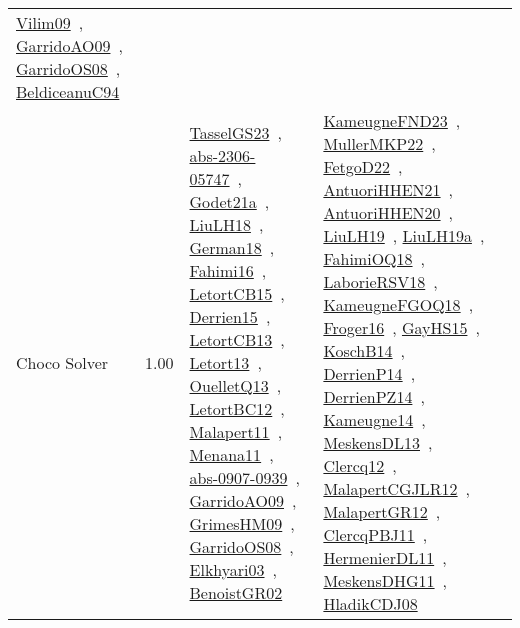 {\begin{longtable}{p{3cm}r>{\raggedright\arraybackslash}p{6cm}>{\raggedright\arraybackslash}p{6cm}>{\raggedright\arraybackslash}p{8cm}}
\href{../works/Vilim09.pdf}{Vilim09}~\cite{Vilim09}, \href{../works/GarridoAO09.pdf}{GarridoAO09}~\cite{GarridoAO09}, \href{../works/GarridoOS08.pdf}{GarridoOS08}~\cite{GarridoOS08}, \href{../works/BeldiceanuC94.pdf}{BeldiceanuC94}~\cite{BeldiceanuC94}\\
\index{Choco Solver}\index{CPSystems!Choco Solver}Choco Solver &  1.00 & \href{../works/TasselGS23.pdf}{TasselGS23}~\cite{TasselGS23}, \href{../works/abs-2306-05747.pdf}{abs-2306-05747}~\cite{abs-2306-05747}, \href{../works/Godet21a.pdf}{Godet21a}~\cite{Godet21a}, \href{../works/LiuLH18.pdf}{LiuLH18}~\cite{LiuLH18}, \href{../works/German18.pdf}{German18}~\cite{German18}, \href{../works/Fahimi16.pdf}{Fahimi16}~\cite{Fahimi16}, \href{../works/LetortCB15.pdf}{LetortCB15}~\cite{LetortCB15}, \href{../works/Derrien15.pdf}{Derrien15}~\cite{Derrien15}, \href{../works/LetortCB13.pdf}{LetortCB13}~\cite{LetortCB13}, \href{../works/Letort13.pdf}{Letort13}~\cite{Letort13}, \href{../works/OuelletQ13.pdf}{OuelletQ13}~\cite{OuelletQ13}, \href{../works/LetortBC12.pdf}{LetortBC12}~\cite{LetortBC12}, \href{../works/Malapert11.pdf}{Malapert11}~\cite{Malapert11}, \href{../works/Menana11.pdf}{Menana11}~\cite{Menana11}, \href{../works/abs-0907-0939.pdf}{abs-0907-0939}~\cite{abs-0907-0939}, \href{../works/GarridoAO09.pdf}{GarridoAO09}~\cite{GarridoAO09}, \href{../works/GrimesHM09.pdf}{GrimesHM09}~\cite{GrimesHM09}, \href{../works/GarridoOS08.pdf}{GarridoOS08}~\cite{GarridoOS08}, \href{../works/Elkhyari03.pdf}{Elkhyari03}~\cite{Elkhyari03}, \href{../works/BenoistGR02.pdf}{BenoistGR02}~\cite{BenoistGR02} & \href{../works/KameugneFND23.pdf}{KameugneFND23}~\cite{KameugneFND23}, \href{../works/MullerMKP22.pdf}{MullerMKP22}~\cite{MullerMKP22}, \href{../works/FetgoD22.pdf}{FetgoD22}~\cite{FetgoD22}, \href{../works/AntuoriHHEN21.pdf}{AntuoriHHEN21}~\cite{AntuoriHHEN21}, \href{../works/AntuoriHHEN20.pdf}{AntuoriHHEN20}~\cite{AntuoriHHEN20}, \href{../works/LiuLH19.pdf}{LiuLH19}~\cite{LiuLH19}, \href{../works/LiuLH19a.pdf}{LiuLH19a}~\cite{LiuLH19a}, \href{../works/FahimiOQ18.pdf}{FahimiOQ18}~\cite{FahimiOQ18}, \href{../works/LaborieRSV18.pdf}{LaborieRSV18}~\cite{LaborieRSV18}, \href{../works/KameugneFGOQ18.pdf}{KameugneFGOQ18}~\cite{KameugneFGOQ18}, \href{../works/Froger16.pdf}{Froger16}~\cite{Froger16}, \href{../works/GayHS15.pdf}{GayHS15}~\cite{GayHS15}, \href{../works/KoschB14.pdf}{KoschB14}~\cite{KoschB14}, \href{../works/DerrienP14.pdf}{DerrienP14}~\cite{DerrienP14}, \href{../works/DerrienPZ14.pdf}{DerrienPZ14}~\cite{DerrienPZ14}, \href{../works/Kameugne14.pdf}{Kameugne14}~\cite{Kameugne14}, \href{../works/MeskensDL13.pdf}{MeskensDL13}~\cite{MeskensDL13}, \href{../works/Clercq12.pdf}{Clercq12}~\cite{Clercq12}, \href{../works/MalapertCGJLR12.pdf}{MalapertCGJLR12}~\cite{MalapertCGJLR12}, \href{../works/MalapertGR12.pdf}{MalapertGR12}~\cite{MalapertGR12}, \href{../works/ClercqPBJ11.pdf}{ClercqPBJ11}~\cite{ClercqPBJ11}, \href{../works/HermenierDL11.pdf}{HermenierDL11}~\cite{HermenierDL11}, \href{../works/MeskensDHG11.pdf}{MeskensDHG11}~\cite{MeskensDHG11}, \href{../works/HladikCDJ08.pdf}{HladikCDJ08}~\cite{HladikCDJ08} & 
\end{longtable}}

